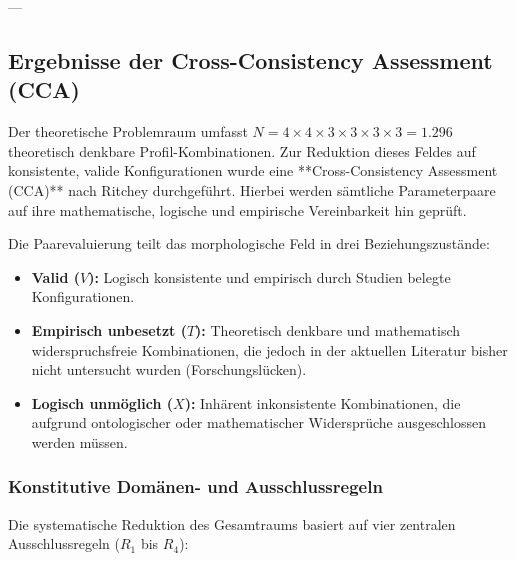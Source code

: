 ---

\subsection{Ergebnisse der Cross-Consistency Assessment (CCA)}
\label{subsec:cca_ergebnisse}

Der theoretische Problemraum umfasst $N = 4 \times 4 \times 3 \times 3 \times 3 \times 3 = 1.296$ theoretisch denkbare Profil-Kombinationen. Zur Reduktion dieses Feldes auf konsistente, valide Konfigurationen wurde eine **Cross-Consistency Assessment (CCA)** nach Ritchey durchgeführt. Hierbei werden sämtliche Parameterpaare auf ihre mathematische, logische und empirische Vereinbarkeit hin geprüft.

Die Paarevaluierung teilt das morphologische Feld in drei Beziehungszustände:
\begin{itemize}
    \item \textbf{Valid ($V$):} Logisch konsistente und empirisch durch Studien belegte Konfigurationen.
    \item \textbf{Empirisch unbesetzt ($T$):} Theoretisch denkbare und mathematisch widerspruchsfreie Kombinationen, die jedoch in der aktuellen Literatur bisher nicht untersucht wurden (Forschungslücken).
    \item \textbf{Logisch unmöglich ($X$):} Inhärent inkonsistente Kombinationen, die aufgrund ontologischer oder mathematischer Widersprüche ausgeschlossen werden müssen.
\end{itemize}

\subsubsection{Konstitutive Domänen- und Ausschlussregeln}

Die systematische Reduktion des Gesamtraums basiert auf vier zentralen Ausschlussregeln ($R_1$ bis $R_4$):

